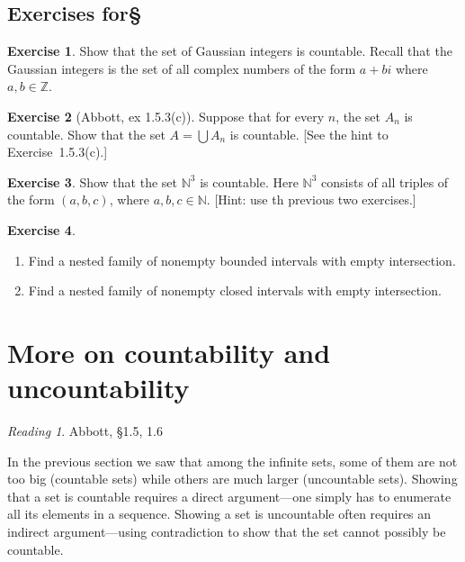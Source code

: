 \documentclass[11pt,oneside]{amsbook}
\newcommand{\NN}{\mathbb N}
\newcommand{\ZZ}{\mathbb Z}
\theoremstyle{definition}
\newtheorem{exerc}{Exercise}[section]
\theoremstyle{plain}
\theoremstyle{definition}
\theoremstyle{remark}
\newtheorem*{reading}{Reading}
\numberwithin{equation}{section}
\numberwithin{figure}{section}
\begin{document}
\newpage
\subsection*{Exercises for\S \thesection}

\begin{exerc}
  Show that the set of Gaussian integers is countable. Recall that the Gaussian integers is the set of all complex numbers of the form $a+bi$ where $a,b\in\ZZ$.
\end{exerc}

\begin{exerc}[Abbott, ex 1.5.3(c)]
  Suppose that for every $n$, the set $A_n$ is countable. Show that the set $A=\bigcup A_n$ is countable. [See the hint to Exercise~1.5.3(c).]
\end{exerc}

\begin{exerc}
  Show that the set $\NN^3$ is countable. Here $\NN^3$ consists of all triples of the form $(a,b,c)$, where $a,b,c\in\NN$. [Hint: use th previous two exercises.]
\end{exerc}

\begin{exerc}
  \begin{enumerate}
    \item Find a nested family of nonempty bounded intervals with empty intersection.
    \item Find a nested family of nonempty closed intervals with empty intersection.
  \end{enumerate}
\end{exerc}

\newpage
\section{More on countability and uncountability}

\begin{reading}
  Abbott, \S 1.5, 1.6
\end{reading}

In the previous section we saw that among the infinite sets, some of them are not too big (countable sets) while others are much larger (uncountable sets). Showing that a set is countable requires a direct argument---one simply has to enumerate all its elements in a sequence. Showing a set is uncountable often requires an indirect argument---using contradiction to show that the set cannot possibly be countable.
\end{document}
